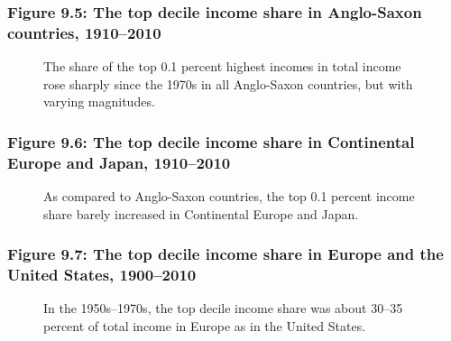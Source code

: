 \documentclass[t]{beamer}\usepackage[]{graphicx}\usepackage[]{color}
\begin{document}
\begin{frame}[label=Figure_9_5]
\frametitle{Figure 9.5: The top decile income share in Anglo-Saxon countries, 1910--2010}
\begin{figure}[t]
\begin{minipage}[b]{\textwidth}
\centering

\caption{The share of the top 0.1 percent highest incomes in total income rose sharply since the 1970s in all Anglo-Saxon countries, but with varying magnitudes.}
\end{minipage}
\end{figure}
\end{frame}


\begin{frame}[label=Figure_9_6]
\frametitle{Figure 9.6: The top decile income share in Continental Europe and Japan, 1910--2010}
\begin{figure}[t]
\begin{minipage}[b]{\textwidth}
\centering

\caption{As compared to Anglo-Saxon countries, the top 0.1 percent income share barely increased in Continental Europe and Japan.}
\end{minipage}
\end{figure}
\end{frame}


\begin{frame}[label=Figure_9_7]
\frametitle{Figure 9.7: The top decile income share in Europe and the United States, 1900--2010}
\begin{figure}[t]
\begin{minipage}[b]{\textwidth}
\centering

\caption{In the 1950s--1970s, the top decile income share was about 30--35 percent of total income in Europe as in the United States.}
\end{minipage}
\end{figure}
\end{frame}
\end{document}
